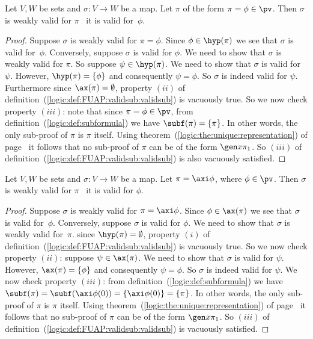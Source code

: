 \begin{prop}\label{logic:prop:FUAP:validsub:recursion:formula}
Let $V, W$ be sets and $\sigma:V\to W$ be a map. Let $\pi$ of the
form $\pi=\phi\in\pv$. Then $\sigma$ is weakly valid for $\pi$
\ifand\ it is valid for~$\phi$.
\end{prop}
\begin{proof}
Suppose $\sigma$ is weakly valid for $\pi=\phi$. Since
$\phi\in\hyp(\pi)$ we see that $\sigma$ is valid for~$\phi$.
Conversely, suppose $\sigma$ is valid for $\phi$. We need to show
that $\sigma$ is weakly valid for $\pi$. So suppose
$\psi\in\hyp(\pi)$. We need to show that $\sigma$ is valid for
$\psi$. However, $\hyp(\pi)=\{\phi\}$ and consequently $\psi=\phi$.
So $\sigma$ is indeed valid for $\psi$. Furthermore since
$\ax(\pi)=\emptyset$, property $(ii)$ of
definition~(\ref{logic:def:FUAP:validsub:validsub}) is vacuously
true. So we now check property $(iii)$: note that since
$\pi=\phi\in\pv$, from definition~(\ref{logic:def:subformula}) we
have $\subf(\pi)=\{\pi\}$. In other words, the only sub-proof of
$\pi$ is $\pi$ itself. Using
theorem~(\ref{logic:the:unique:representation}) of
page~\pageref{logic:the:unique:representation} it follows that no
sub-proof of $\pi$ can be of the form $\gen x\pi_{1}$. So $(iii)$ of
definition~(\ref{logic:def:FUAP:validsub:validsub}) is also
vacuously satisfied.
\end{proof}

\begin{prop}\label{logic:prop:FUAP:validsub:recursion:axiom}
Let $V, W$ be sets and $\sigma:V\to W$ be a map. Let $\pi=\axi\phi$,
where $\phi\in\pv$. Then $\sigma$ is weakly valid for $\pi$ \ifand\
it is valid for $\phi$.
\end{prop}
\begin{proof}
Suppose $\sigma$ is weakly valid for $\pi=\axi\phi$. Since
$\phi\in\ax(\pi)$ we see that $\sigma$ is valid for~$\phi$.
Conversely, suppose $\sigma$ is valid for $\phi$. We need to show
that $\sigma$ is weakly valid for~$\pi$. since
$\hyp(\pi)=\emptyset$, property $(i)$ of
definition~(\ref{logic:def:FUAP:validsub:validsub}) is vacuously
true. So we now check property $(ii)$: suppose $\psi\in\ax(\pi)$. We
need to show that $\sigma$ is valid for $\psi$. However,
$\ax(\pi)=\{\phi\}$ and consequently $\psi=\phi$. So $\sigma$ is
indeed valid for $\psi$. We now check property $(iii)$: from
definition~(\ref{logic:def:subformula}) we have
$\subf(\pi)=\subf(\axi\phi(0))=\{\axi\phi(0)\}=\{\pi\}$. In other
words, the only sub-proof of $\pi$ is $\pi$ itself. Using
theorem~(\ref{logic:the:unique:representation}) of
page~\pageref{logic:the:unique:representation} it follows that no
sub-proof of $\pi$ can be of the form $\gen x\pi_{1}$. So $(iii)$ of
definition~(\ref{logic:def:FUAP:validsub:validsub}) is vacuously
satisfied.
\end{proof}

